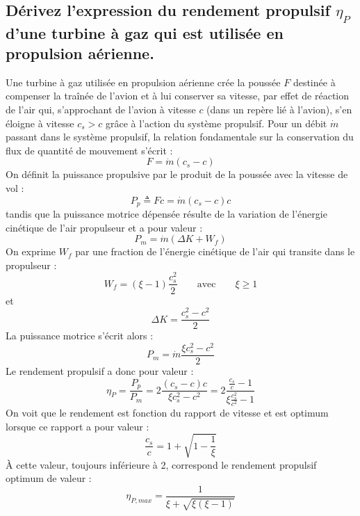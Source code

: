 \subsection{Dérivez l'expression du rendement propulsif $\eta_P$ d'une turbine à gaz qui est utilisée en propulsion aérienne.}
Une turbine à gaz utilisée en propulsion aérienne crée la poussée $F$ destinée à compenser la traînée de l'avion et à lui conserver sa vitesse, par effet de réaction de l'air qui, s'approchant de l'avion à vitesse $c$ (dans un repère lié à l'avion), s'en éloigne à vitesse $c_s > c$ grâce à l'action du système propulsif. Pour un débit $\dot{m}$ passant dans le système propulsif, la relation fondamentale sur la conservation du flux de quantité de mouvement s'écrit :
\begin{equation} F = \dot{m}(c_s-c) \end{equation}
On définit la puissance propulsive par le produit de la poussée avec la vitesse de vol :
\begin{equation} P_p \triangleq Fc = \dot{m}(c_s-c)c \end{equation}
tandis que la puissance motrice dépensée résulte de la variation de l'énergie cinétique de l'air propulseur et a pour valeur :
\begin{equation} P_m = \dot{m}(\Delta K + W_f) \end{equation}
On exprime $W_f$ par une fraction de l'énergie cinétique de l'air qui transite dans le propulseur :
\begin{equation} W_f = (\xi-1)\frac{c_s^2}{2} \qquad \text{avec} \qquad \xi\geq 1 \end{equation}
et
\begin{equation} \Delta K = \frac{c_s^2-c^2}{2} \end{equation}
La puissance motrice s'écrit alors :
\begin{equation} P_m = \dot{m}\frac{\xi c_s^2-c^2}{2} \end{equation}
Le rendement propulsif a donc pour valeur :
\begin{equation} \eta_P = \frac{P_p}{P_m} = 2\frac{(c_s-c)c}{\xi c_s^2-c^2}  = 2\frac{\frac{c_s}{c}-1}{\xi\frac{c_s^2}{c^2}-1} \end{equation}
On voit que le rendement est fonction du rapport de vitesse et est optimum lorsque ce rapport a pour valeur :
\begin{equation} \frac{c_s}{c} = 1 + \sqrt{1-\frac{1}{\xi}} \end{equation}
À cette valeur, toujours inférieure à 2, correspond le rendement propulsif optimum de valeur :
\begin{equation} \eta_{P,max} = \frac{1}{\xi+\sqrt{\xi(\xi-1)}} \end{equation}

